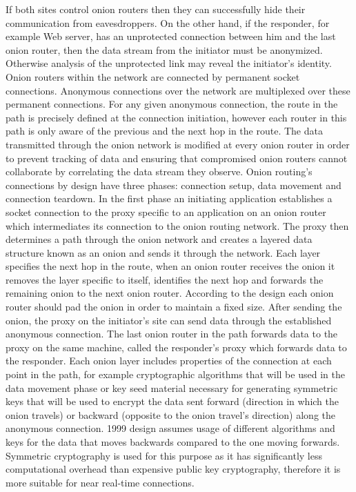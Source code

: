 If both sites control onion routers then they can successfully hide their communication from eavesdroppers. On the other hand, if the responder, for example Web server, has an unprotected connection between him and the last onion router, then the data stream from the initiator must be anonymized. Otherwise analysis of the unprotected link may reveal the initiator’s identity.
Onion routers within the network are connected by permanent socket connections. Anonymous connections over the network are multiplexed over these permanent connections. For any given anonymous connection, the route in the path is precisely defined at the connection initiation, however each router in this path is only aware of the previous and the next hop in the route. The data transmitted through the onion network is modified at every onion router in order to prevent tracking of data and ensuring that compromised onion routers cannot collaborate by correlating the data stream they observe.
Onion routing’s connections by design have three phases: connection setup, data movement and connection teardown. In the first phase an initiating application establishes a socket connection to the proxy specific to an application on an onion router which intermediates its connection to the onion routing network. The proxy then determines a path through the onion network and creates a layered data structure known as an onion and sends it through the network. Each layer specifies the next hop in the route, when an onion router receives the onion it removes the layer specific to itself, identifies the next hop and forwards the remaining onion to the next onion router. According to the design each onion router should pad the onion in order to maintain a fixed size. After sending the onion, the proxy on the initiator’s site can send data through the established anonymous connection. The last onion router in the path forwards data to the proxy on the same machine, called the responder’s proxy which forwards data to the responder.
Each onion layer includes properties of the connection at each point in the path, for example cryptographic algorithms that will be used in the data movement phase or key seed material necessary for generating symmetric keys that will be used to encrypt the data sent forward (direction in which the onion travels) or backward (opposite to the onion travel’s direction) along the anonymous connection. 1999 design assumes usage of different algorithms and keys for the data that moves backwards compared to the one moving forwards. Symmetric cryptography is used for this purpose as it has significantly less computational overhead than expensive public key cryptography, therefore it is more suitable for near real-time connections.
